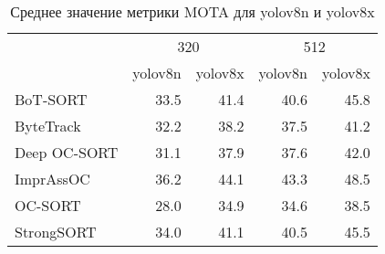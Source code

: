 \begin{table}[htbp]

\caption{Среднее значение метрики MOTA для yolov8n и yolov8x}
\label{tab:mean_mota_yolo_size}
\centering
\begin{tabular}{lrrrr}
 & \multicolumn{2}{c}{320} & \multicolumn{2}{c}{512} \\
  & yolov8n & yolov8x & yolov8n & yolov8x \\
\midrule
BoT-SORT & 33.5 & 41.4 & 40.6 & 45.8 \\
ByteTrack & 32.2 & 38.2 & 37.5 & 41.2 \\
Deep OC-SORT & 31.1 & 37.9 & 37.6 & 42.0 \\
ImprAssOC & 36.2 & 44.1 & 43.3 & 48.5 \\
OC-SORT & 28.0 & 34.9 & 34.6 & 38.5 \\
StrongSORT & 34.0 & 41.1 & 40.5 & 45.5 \\
\bottomrule
\end{tabular}\end{table}